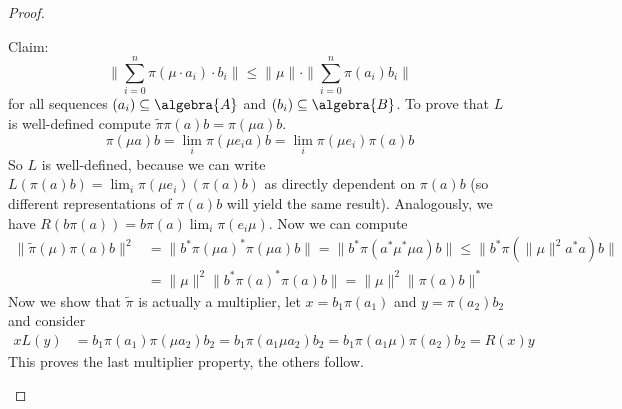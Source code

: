 \documentclass[a4paper]{article}
\begin{document}
\begin{proof}
\begin{enumerate}
		Claim:
		\begin{equation*}
			\| \sum_{i=0}^n \pi(\mu \cdot a_i) \cdot b_i \| \leq \|\mu \| \cdot \| \sum_{i=0}^n \pi(a_i) b_i \|
		\end{equation*}
		for all sequences $(a_i) \subseteq \algebra{A}$ and $(b_i) \subseteq \algebra{B}$.
		To prove that $L$ is well-defined compute $\tilde{\pi} \pi(a) b = \pi(\mu a) b$.
		\begin{equation*}
			\pi(\mu a) b = \lim_i \pi(\mu e_i a) b = \lim_i \pi(\mu e_i) \pi(a) b
		\end{equation*}
		So $L$ is well-defined, because we can write $L(\pi(a) b) = \lim_i \pi(\mu e_i) (\pi(a) b)$ as directly dependent on $\pi(a) b$ (so different representations of $\pi(a) b$ will yield the same result).
		Analogously, we have $R(b\pi(a)) = b \pi(a) \lim_i \pi(e_i \mu)$.
		Now we can compute
		\begin{align*}
			\|\tilde{\pi}(\mu) \pi(a) b\|^2 &= \| b^* \pi(\mu a)^* \pi(\mu a) b\|  = \| b^* \pi(a^* \mu^* \mu a) b \| \leq \| b^* \pi(\| \mu \|^2 a^* a) b \| \\ &= \|\mu\|^2 \|b^* \pi(a)^* \pi(a) b\| = \|\mu\|^2 \|\pi(a) b\|^*
		\end{align*}
		Now we show that $\tilde{\pi}$ is actually a multiplier,
		let $x = b_1 \pi(a_1)$ and $y = \pi(a_2) b_2$ and consider
		\begin{align*}
			x L(y) &= b_1 \pi(a_1) \pi(\mu a_2) b_2 = b_1 \pi(a_1 \mu a_2) b_2 = b_1 \pi(a_1 \mu) \pi(a_2) b_2 = R(x) y
		\end{align*}
		This proves the last multiplier property, the others follow.


\end{enumerate}
\end{proof}
\end{document}

